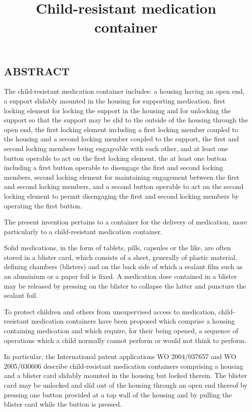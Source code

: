 \documentclass[11pt,a4paper]{article}
\title{Child-resistant medication container}
\begin{document}
\maketitle

\subsection{ABSTRACT}

The child-resistant medication container includes: a housing having an open end, a support slidably mounted in the housing for supporting medication, first locking element for locking the support in the housing and for unlocking the support so that the support may be slid to the outside of the housing through the open end, the first locking element including a first locking member coupled to the housing and a second locking member coupled to the support, the first and second locking members being engageable with each other, and at least one button operable to act on the first locking element, the at least one button including a first button operable to disengage the first and second locking members, second locking element for maintaining engagement between the first and second locking members, and a second button operable to act on the second locking element to permit disengaging the first and second locking members by operating the first button.

The present invention pertains to a container for the delivery of medication, more particularly to a child-resistant medication container.

Solid medications, in the form of tablets, pills, capsules or the like, are often stored in a blister card, which consists of a sheet, generally of plastic material, defining chambers (blisters) and on the back side of which a sealant film such as an aluminium or a paper foil is fixed. A medication dose contained in a blister may be released by pressing on the blister to collapse the latter and puncture the sealant foil.

To protect children and others from unsupervised access to medication, child-resistant medication containers have been proposed which comprise a housing containing medication and which require, for their being opened, a sequence of operations which a child normally cannot perform or would not think to perform.

In particular, the International patent applications WO 2004/037657 and WO 2005/030606 describe child-resistant medication containers comprising a housing and a blister card slidably mounted in the housing but locked therein. The blister card may be unlocked and slid out of the housing through an open end thereof by pressing one button provided at a top wall of the housing and by pulling the blister card while the button is pressed.
\end{document}
